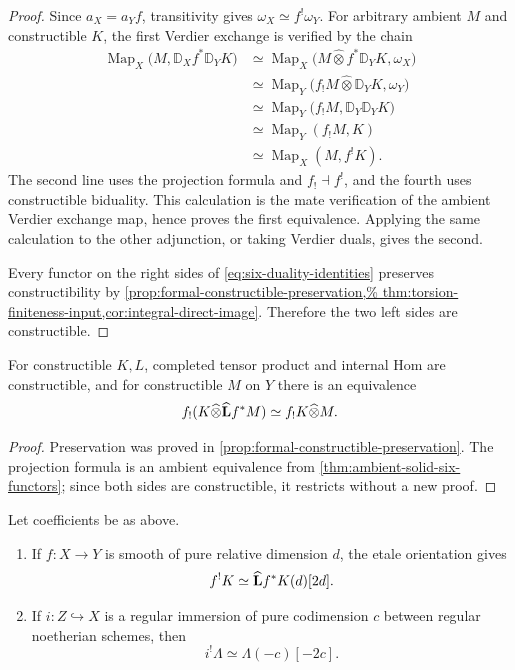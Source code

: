 \begin{proof}
Since \(a_X=a_Yf\), transitivity gives
\(\omega_X\simeq f^!\omega_Y\).  For arbitrary ambient \(M\) and constructible \(K\), the first
Verdier exchange is verified by the chain
\begin{align*}
 \operatorname{Map}_X
  \bigl(M,\mathbb D_Xf^*\mathbb D_YK\bigr)
 &\simeq
 \operatorname{Map}_X
  \bigl(M\widehat\otimes f^*\mathbb D_YK,\omega_X\bigr)\\
 &\simeq
 \operatorname{Map}_Y
  \bigl(f_!M\widehat\otimes\mathbb D_YK,\omega_Y\bigr)\\
 &\simeq
 \operatorname{Map}_Y
  \bigl(f_!M,\mathbb D_Y\mathbb D_YK\bigr)\\
 &\simeq \operatorname{Map}_Y(f_!M,K)\\
 &\simeq \operatorname{Map}_X(M,f^!K).
\end{align*}
The second line uses the projection formula and \(f_!\dashv f^!\), and the
fourth uses constructible biduality.  This calculation is the mate
verification of the ambient Verdier exchange map, hence proves the first
equivalence.  Applying the same calculation to the other adjunction, or
taking Verdier duals, gives the second.

Every functor on the right sides of
\eqref{eq:six-duality-identities} preserves constructibility by
\cref{prop:formal-constructible-preservation,%
thm:torsion-finiteness-input,cor:integral-direct-image}.  Therefore the two
left sides are constructible.
\end{proof}

\begin{proposition}
\label{prop:proetale-tensor-hom}
For constructible \(K,L\), completed tensor product and internal Hom are
constructible, and for constructible \(M\) on \(Y\) there is an equivalence
\begin{equation}
\label{eq:fshriek-projection}
 f_!(K\widehat\otimes\widehat{\mathbf L} f^*M)
   \simeq f_!K\widehat\otimes M.
\end{equation}
\end{proposition}

\begin{proof}
Preservation was proved in
\cref{prop:formal-constructible-preservation}.  The projection formula is an
ambient equivalence from \cref{thm:ambient-solid-six-functors}; since both
sides are constructible, it restricts without a new proof.
\end{proof}

\begin{theorem}
\label{thm:proetale-purity-inputs}
Let coefficients be as above.
\begin{enumerate}
\item If \(f:X\to Y\) is smooth of pure relative dimension \(d\), the
      etale orientation gives
      \[
       f^!K\simeq\widehat{\mathbf L} f^*K(d)[2d].
      \]
\item If \(i:Z\hookrightarrow X\) is a regular immersion of pure codimension
      \(c\) between regular noetherian schemes, then
      \[
       i^!\Lambda\simeq\Lambda(-c)[-2c].
      \]
\end{enumerate}
\end{theorem}

